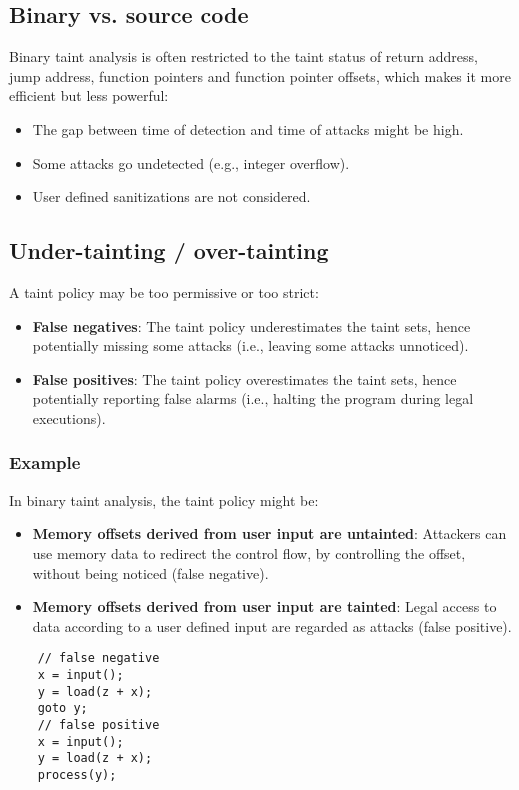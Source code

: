 \documentclass[a4paper, 10pt, titlepage]{article}
\begin{document}
\subsection{Binary vs. source code}
Binary taint analysis is often restricted to the taint status of return address, jump address, function pointers and function pointer offsets, which makes it more efficient but less powerful:
\begin{itemize}
\item The gap between time of detection and time of attacks might be
high.
\item Some attacks go undetected (e.g., integer overflow).
\item User defined sanitizations are not considered.
\end{itemize}

\subsection{Under-tainting / over-tainting}
A taint policy may be too permissive or too strict:
\begin{itemize}
\item \textbf{False negatives}: The taint policy underestimates the taint sets, hence potentially missing some attacks (i.e., leaving some attacks unnoticed).
\item \textbf{False positives}: The taint policy overestimates the taint sets, hence potentially reporting false alarms (i.e., halting the program during legal executions).
\end{itemize}

\subsubsection*{Example}
In binary taint analysis, the taint policy might be:
\begin{itemize}
\item \textbf{Memory offsets derived from user input are untainted}: Attackers can use memory data to redirect the control flow, by controlling the offset, without being noticed (false negative).
\item \textbf{Memory offsets derived from user input are tainted}: Legal access to data according to a user defined input are regarded as attacks (false positive).
\end{itemize}
\begin{lstlisting}
	// false negative
	x = input();
	y = load(z + x);
	goto y;
	// false positive
	x = input();
	y = load(z + x);
	process(y);
\end{lstlisting}
\end{document}
